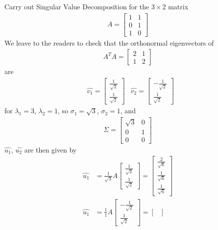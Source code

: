 \begin{exmp}
Carry out Singular Value Decomposition for the $3 \times 2$ matrix
\begin{align*}
A =
\begin{bmatrix}
1 & 1 \\
0 & 1 \\
1 & 0
\end{bmatrix}
\end{align*}
We leave to the readers to check that the orthonormal eigenvectors of 
\begin{align*}
A^TA = 
\begin{bmatrix}
2 & 1 \\
1 & 2
\end{bmatrix}
\end{align*}
are 
\begin{align*}
& \hat{v_1} =
\begin{bmatrix}
\frac{1}{\sqrt{2}} \\
\frac{1}{\sqrt{2}}
\end{bmatrix}
& \hat{v_2} =
\begin{bmatrix}
-\frac{1}{\sqrt{2}} \\
\frac{1}{\sqrt{2}}
\end{bmatrix}
\end{align*}
for $\lambda_1 = 3$, $\lambda_2 = 1$, so $\sigma_1 = \sqrt{3}$, $\sigma_2 = 1$, and
\begin{align*}
\Sigma =
\begin{bmatrix}
\sqrt{3} & 0 \\
0 & 1 \\
0 & 0
\end{bmatrix}   
\end{align*}
$\hat{u_1}$, $\hat{u_2}$ are then given by
\begin{align*}
\hat{u_1} &= \frac{1}{\sqrt{3}}A
\begin{bmatrix}
\frac{1}{\sqrt{2}} \\
\frac{1}{\sqrt{2}}
\end{bmatrix}
=
\begin{bmatrix}
\frac{2}{\sqrt{6}} \\
\frac{1}{\sqrt{6}} \\
\frac{1}{\sqrt{6}} 
\end{bmatrix} \\
\hat{u_1} &= \frac{1}{1}A
\begin{bmatrix}
-\frac{1}{\sqrt{2}} \\
\frac{1}{\sqrt{2}}
\end{bmatrix}
=
\begin{bmatrix}

\end{bmatrix}
\end{align*}
\end{exmp}
